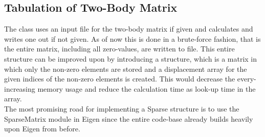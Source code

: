 \subsection{Tabulation of Two-Body Matrix}
    The  class uses an input file for the two-body
    matrix if given and calculates  and writes one out if not given. As of now
    this is done in a brute-force fashion, that is the entire matrix, including
    all zero-values, are written to file. This entire structure can be improved
    upon by introducing a  structure, which is a matrix in
    which only the non-zero elements are stored and a displacement array for
    the given indices of the non-zero elements is created. This would decrease
    the every-increasing memory usage and reduce the calculation time as
    look-up time in the array. \\
    The most promising road for implementing a Sparse structure is to use the
    SparseMatrix module in Eigen since the entire code-base already builds
    heavily upon Eigen from before.


